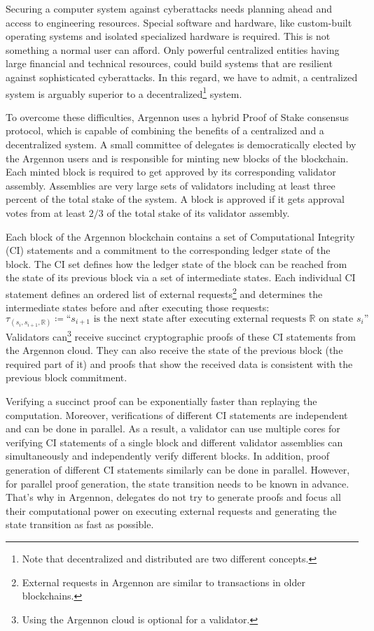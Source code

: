 Securing a computer system against cyberattacks needs planning ahead and access to engineering resources.
Special software and hardware, like custom-built operating systems and isolated specialized hardware is required.
This is not something a normal user can afford. Only powerful centralized entities having large financial and
technical resources, could build
systems that are resilient against sophisticated cyberattacks. In this regard, we have to admit, a centralized system is
arguably superior to a decentralized\footnote{Note that decentralized and distributed are two different concepts.}
system.

To overcome these difficulties, Argennon uses a hybrid Proof of Stake consensus protocol, which is
capable of combining the benefits of a centralized and a decentralized system. A small committee of
delegates is democratically elected
by the Argennon users and is responsible for minting new blocks of the blockchain. Each
minted block is required to get approved by its corresponding validator assembly. Assemblies are very large sets of
validators including at least three percent of the total stake of the system. A block is approved if it gets
approval votes from at least \(2/3\) of the total stake of its validator assembly.

Each block of the Argennon blockchain contains a set of Computational Integrity (CI) statements and a commitment to
the corresponding ledger state of the block. The CI set defines how
the ledger state of the block can be reached from the state of its previous block via a set of intermediate states.
Each individual CI statement defines an ordered list of external requests\footnote{External requests in Argennon are
similar to transactions in older blockchains.} and determines the intermediate states before and after executing those
requests:
\[
    \tau_{(s_i,s_{i+1},\mathbb{R})} \coloneqq \text{``$s_{i+1}$ is the next state after executing external requests
        $\mathbb{R}$ on state $s_i$''}
\]
Validators can\footnote{Using the Argennon cloud is optional for a validator.} receive succinct cryptographic proofs
of these CI statements from the Argennon cloud. They can also receive the state of the previous
block (the required part of it) and proofs that show the received data is consistent with the previous block commitment.

Verifying a succinct proof can be exponentially faster than replaying the computation. Moreover, verifications of
different CI statements are independent and can be done in parallel. As a result, a validator can use multiple cores for
verifying CI statements of a single block and different validator assemblies can simultaneously and independently
verify different blocks.
In addition, proof generation of different CI statements similarly can be done in parallel. However, for parallel
proof generation, the state transition needs to be known in advance. That's why in Argennon, delegates do not try
to generate proofs and focus all their computational power on executing external requests and
generating the state transition as fast as possible.


